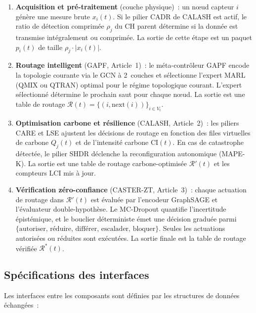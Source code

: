 \begin{enumerate}
    \item \textbf{Acquisition et pré-traitement} (couche physique)~: un n\oe{}ud capteur $i$ génère une mesure brute $x_i(t)$. Si le pilier CADR de CALASH est actif, le ratio de détection comprimée $\rho_j$ du CH parent détermine si la donnée est transmise intégralement ou comprimée. La sortie de cette étape est un paquet $p_i(t)$ de taille $\rho_j \cdot |x_i(t)|$.
    \item \textbf{Routage intelligent} (GAPF, Article~1)~: le méta-contrôleur GAPF encode la topologie courante via le GCN à 2~couches et sélectionne l'expert MARL (QMIX ou QTRAN) optimal pour le régime topologique courant. L'expert sélectionné détermine le prochain saut pour chaque n\oe{}ud. La sortie est une table de routage $\mathcal{R}(t) = \{(i, \text{next}(i))\}_{i \in V_t}$.
    \item \textbf{Optimisation carbone et résilience} (CALASH, Article~2)~: les piliers CARE et LSE ajustent les décisions de routage en fonction des files virtuelles de carbone $Q_j(t)$ et de l'intensité carbone $\text{CI}(t)$. En cas de catastrophe détectée, le pilier SHDR déclenche la reconfiguration autonomique (MAPE-K). La sortie est une table de routage carbone-optimisée $\mathcal{R}'(t)$ et les compteurs LCI mis à jour.
    \item \textbf{Vérification zéro-confiance} (CASTER-ZT, Article~3)~: chaque actuation de routage dans $\mathcal{R}'(t)$ est évaluée par l'encodeur GraphSAGE et l'évaluateur double-hypothèse. Le MC-Dropout quantifie l'incertitude épistémique, et le bouclier déterministe émet une décision graduée parmi $\{\text{autoriser, réduire, différer, escalader, bloquer}\}$. Seules les actuations autorisées ou réduites sont exécutées. La sortie finale est la table de routage vérifiée $\mathcal{R}^*(t)$.
\end{enumerate}

\subsection{Spécifications des interfaces}

Les interfaces entre les composants sont définies par les structures de données échangées~:

